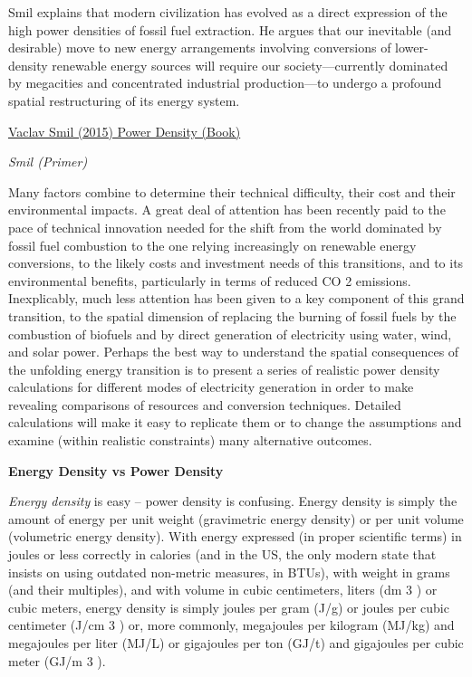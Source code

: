 \documentclass[
]{book}
\begin{document}
Smil explains that modern civilization has evolved as a direct expression of the high power densities of fossil fuel extraction. He argues that our inevitable (and desirable) move to new energy arrangements involving conversions of lower-density renewable energy sources will require our society---currently dominated by megacities and concentrated industrial production---to undergo a profound spatial restructuring of its energy system.

\href{https://mitpress.mit.edu/books/power-density}{Vaclav Smil (2015) Power Density (Book)}

\emph{Smil (Primer)}

Many factors combine to determine their technical difficulty, their cost and their environmental
impacts. A great deal of attention has been recently paid to the pace of technical innovation
needed for the shift from the world dominated by fossil fuel combustion to the one relying
increasingly on renewable energy conversions, to the likely costs and investment needs of this
transitions, and to its environmental benefits, particularly in terms of reduced CO 2 emissions.
Inexplicably, much less attention has been given to a key component of this grand transition, to
the spatial dimension of replacing the burning of fossil fuels by the combustion of biofuels and
by direct generation of electricity using water, wind, and solar power. Perhaps the best way to
understand the spatial consequences of the unfolding energy transition is to present a series of
realistic power density calculations for different modes of electricity generation in order to make
revealing comparisons of resources and conversion techniques. Detailed calculations will make it
easy to replicate them or to change the assumptions and examine (within realistic constraints)
many alternative outcomes.

\textbf{Energy Density vs Power Density}

\emph{Energy density} is easy -- power density is confusing. Energy density is simply the amount of
energy per unit weight (gravimetric energy density) or per unit volume (volumetric energy
density). With energy expressed (in proper scientific terms) in joules or less correctly in calories
(and in the US, the only modern state that insists on using outdated non-metric measures, in
BTUs), with weight in grams (and their multiples), and with volume in cubic centimeters, liters
(dm 3 ) or cubic meters, energy density is simply joules per gram (J/g) or joules per cubic
centimeter (J/cm 3 ) or, more commonly, megajoules per kilogram (MJ/kg) and megajoules per
liter (MJ/L) or gigajoules per ton (GJ/t) and gigajoules per cubic meter (GJ/m 3 ).
\end{document}
